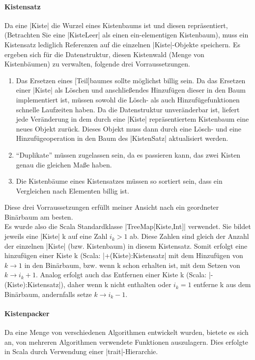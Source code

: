 \paragraph{Kistensatz}
Da eine |Kiste| die Wurzel eines Kistenbaums ist und diesen repräsentiert, (Betrachten Sie eine |KisteLeer| als einen ein-elementigen Kistenbaum),
  muss ein Kistensatz lediglich Referenzen auf die einzelnen |Kiste|-Objekte speichern.
Es ergeben sich für die Datenstruktur, diesen Kistenwald (Menge von Kistenbäumen) zu verwalten, folgende drei Vorraussetzungen. 
\begin{enumerate}
 \item Das Ersetzen eines [Teil]baumes sollte möglichst billig sein.
Da das Ersetzen einer |Kiste| als Löschen und anschließendes Hinzufügen dieser in den Baum implementiert ist,
  müssen sowohl die Lösch- als auch Hinzufügefunktionen schnelle Laufzeiten haben.
Da die Datenstruktur unveränderbar ist, liefert jede Veränderung in dem durch eine |Kiste| repräsentiertem Kistenbaum eine neues Objekt zurück.
Dieses Objekt muss dann durch eine Lösch- und eine Hinzufügeoperation in den Baum des |KistenSatz| aktualisiert werden.
 \item ``Duplikate'' müssen zugelassen sein, da es passieren kann, das zwei Kisten genau die gleichen Maße haben.
 \item Die Kistenbäume eines Kistensatzes müssen so sortiert sein, dass ein Vergleichen nach Elementen billig ist.
\end{enumerate}
Diese drei Vorraussetzungen erfüllt meiner Ansicht nach ein geordneter Binärbaum am besten. \\ %
Es wurde also die Scala Standardklasse |TreeMap[Kiste,Int]| verwendet. Sie bildet jeweils eine |Kiste| k auf eine Zahl $i_k > 1$ ab.
Diese Zahlen sind gleich der Anzahl der einzelnen |Kiste| (bzw. Kistenbaum) in diesem Kistensatz.
Somit erfolgt eine hinzufügen einer Kiste k (Scala: |+(Kiste):Kistensatz| mit dem Hinzufügen von $k \rightarrow 1$ in den Binärbaum,
  bzw. wenn k schon erhalten ist, mit dem Setzen von $k \rightarrow i_k + 1$.
Analog erfolgt auch das Entfernen einer Kiste k (Scala: |-(Kiste):Kistensatz|),
  daher wenn k nicht enthalten oder $i_k = 1$ entferne k aus dem Binärbaum, andernfalls setze $k \rightarrow i_k - 1$.

\paragraph{Kistenpacker}
Da eine Menge von verschiedenen Algorithmen entwickelt wurden, bietete es sich an, von mehreren Algorithmen verwendete Funktionen auszulagern.
Dies erfolgte in Scala durch Verwendung einer |trait|-Hierarchie. %
